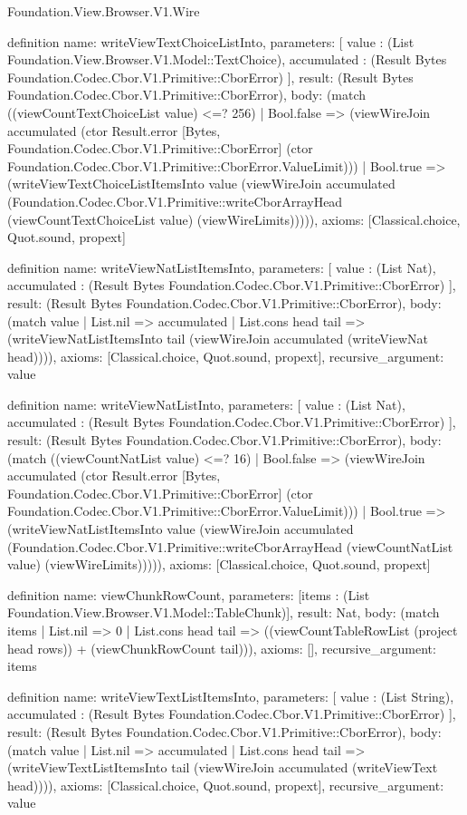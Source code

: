 \begin{lexlean}{Foundation.View.Browser.V1.Wire}
\begin{semanticmodule}
definition{
  name: writeViewTextChoiceListInto,
  parameters: [
    value : (List Foundation.View.Browser.V1.Model::TextChoice),
    accumulated : (Result Bytes Foundation.Codec.Cbor.V1.Primitive::CborError)
  ],
  result: (Result Bytes Foundation.Codec.Cbor.V1.Primitive::CborError),
  body: (match ((viewCountTextChoiceList value) <=? 256)
    | Bool.false => (viewWireJoin accumulated (ctor Result.error [Bytes, Foundation.Codec.Cbor.V1.Primitive::CborError] (ctor Foundation.Codec.Cbor.V1.Primitive::CborError.ValueLimit)))
    | Bool.true => (writeViewTextChoiceListItemsInto value (viewWireJoin accumulated (Foundation.Codec.Cbor.V1.Primitive::writeCborArrayHead (viewCountTextChoiceList value) (viewWireLimits))))),
  axioms: [Classical.choice, Quot.sound, propext]
}

definition{
  name: writeViewNatListItemsInto,
  parameters: [
    value : (List Nat),
    accumulated : (Result Bytes Foundation.Codec.Cbor.V1.Primitive::CborError)
  ],
  result: (Result Bytes Foundation.Codec.Cbor.V1.Primitive::CborError),
  body: (match value
    | List.nil => accumulated
    | List.cons head tail => (writeViewNatListItemsInto tail (viewWireJoin accumulated (writeViewNat head)))),
  axioms: [Classical.choice, Quot.sound, propext],
  recursive_argument: value
}

definition{
  name: writeViewNatListInto,
  parameters: [
    value : (List Nat),
    accumulated : (Result Bytes Foundation.Codec.Cbor.V1.Primitive::CborError)
  ],
  result: (Result Bytes Foundation.Codec.Cbor.V1.Primitive::CborError),
  body: (match ((viewCountNatList value) <=? 16)
    | Bool.false => (viewWireJoin accumulated (ctor Result.error [Bytes, Foundation.Codec.Cbor.V1.Primitive::CborError] (ctor Foundation.Codec.Cbor.V1.Primitive::CborError.ValueLimit)))
    | Bool.true => (writeViewNatListItemsInto value (viewWireJoin accumulated (Foundation.Codec.Cbor.V1.Primitive::writeCborArrayHead (viewCountNatList value) (viewWireLimits))))),
  axioms: [Classical.choice, Quot.sound, propext]
}

definition{
  name: viewChunkRowCount,
  parameters: [items : (List Foundation.View.Browser.V1.Model::TableChunk)],
  result: Nat,
  body: (match items
    | List.nil => 0
    | List.cons head tail => ((viewCountTableRowList (project head rows)) + (viewChunkRowCount tail))),
  axioms: [],
  recursive_argument: items
}

definition{
  name: writeViewTextListItemsInto,
  parameters: [
    value : (List String),
    accumulated : (Result Bytes Foundation.Codec.Cbor.V1.Primitive::CborError)
  ],
  result: (Result Bytes Foundation.Codec.Cbor.V1.Primitive::CborError),
  body: (match value
    | List.nil => accumulated
    | List.cons head tail => (writeViewTextListItemsInto tail (viewWireJoin accumulated (writeViewText head)))),
  axioms: [Classical.choice, Quot.sound, propext],
  recursive_argument: value
}


\end{semanticmodule}
\end{lexlean}
